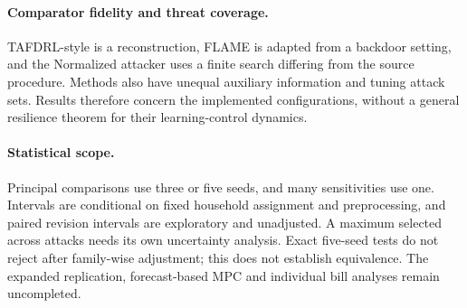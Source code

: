 \paragraph{Comparator fidelity and threat coverage.}
TAFDRL-style is a reconstruction, FLAME is adapted from a backdoor setting, and the Normalized attacker uses a finite search differing from the source procedure. Methods also have unequal auxiliary information and tuning attack sets. Results therefore concern the implemented configurations, without a general resilience theorem for their learning-control dynamics.

\paragraph{Statistical scope.}
Principal comparisons use three or five seeds, and many sensitivities use one. Intervals are conditional on fixed household assignment and preprocessing, and paired revision intervals are exploratory and unadjusted. A maximum selected across attacks needs its own uncertainty analysis. Exact five-seed tests do not reject after family-wise adjustment; this does not establish equivalence. The expanded replication, forecast-based MPC and individual bill analyses remain uncompleted.
